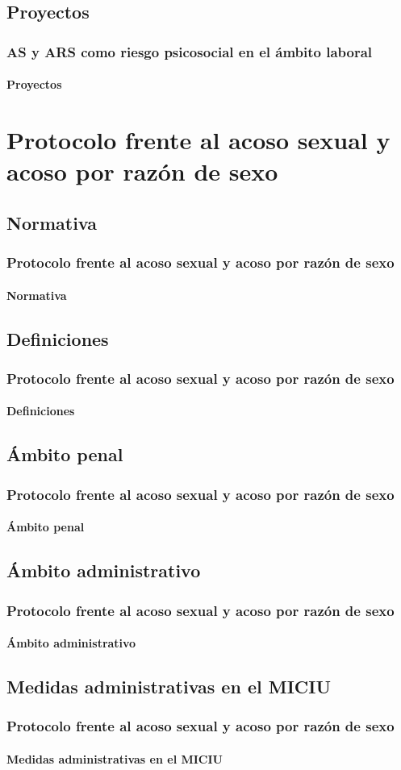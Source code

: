 \documentclass{beamer}
\begin{document}
    \subsection{Proyectos}
    \begin{frame}
        \frametitle{AS y ARS como riesgo psicosocial en el ámbito laboral}
        \framesubtitle{Proyectos}
    \end{frame}


    \section{Protocolo frente al acoso sexual y acoso por razón de sexo}

    \subsection{Normativa}
    \begin{frame}
        \frametitle{Protocolo frente al acoso sexual y acoso por razón de sexo}
        \framesubtitle{Normativa}
    \end{frame}

    \subsection{Definiciones}
    \begin{frame}
        \frametitle{Protocolo frente al acoso sexual y acoso por razón de sexo}
        \framesubtitle{Definiciones}
    \end{frame}

    \subsection{Ámbito penal}
    \begin{frame}
        \frametitle{Protocolo frente al acoso sexual y acoso por razón de sexo}
        \framesubtitle{Ámbito penal}
    \end{frame}

    \subsection{Ámbito administrativo}
    \begin{frame}
        \frametitle{Protocolo frente al acoso sexual y acoso por razón de sexo}
        \framesubtitle{Ámbito administrativo}
    \end{frame}

    \subsection{Medidas administrativas en el MICIU}
    \begin{frame}
        \frametitle{Protocolo frente al acoso sexual y acoso por razón de sexo}
        \framesubtitle{Medidas administrativas en el MICIU}
    \end{frame}
\end{document}
